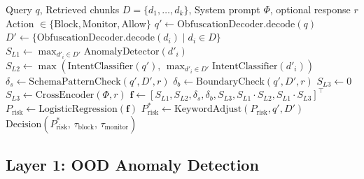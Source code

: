 ﻿\documentclass[conference]{IEEEtran}
\begin{document}
\begin{algorithm}[t]
\caption{RAG-Shield Pipeline Detection Flow}
\label{alg:detection}
\scriptsize
\begin{algorithmic}[1]
\REQUIRE Query $q$, Retrieved chunks $D = \{d_1, \ldots, d_k\}$,
         System prompt $\Phi$, optional response $r$
\ENSURE Action $\in \{\text{Block}, \text{Monitor}, \text{Allow}\}$
\STATE $q' \leftarrow \text{ObfuscationDecoder.decode}(q)$
\STATE $D' \leftarrow \{\text{ObfuscationDecoder.decode}(d_i) \mid d_i \in D\}$
\STATE {}
\STATE $S_{L1} \leftarrow \max_{d'_i \in D'} \text{AnomalyDetector}(d'_i)$
\STATE $S_{L2} \leftarrow \max\!\left(\text{IntentClassifier}(q'),\,
         \max_{d'_i \in D'} \text{IntentClassifier}(d'_i)\right)$
    \RETURN {}
\ENDIF
\STATE $\delta_s \leftarrow \text{SchemaPatternCheck}(q',D',r)$
\STATE $\delta_b \leftarrow \text{BoundaryCheck}(q',D',r)$
\STATE $S_{L3} \leftarrow 0$
        \RETURN {}
    \ENDIF
    \STATE $S_{L3} \leftarrow \text{CrossEncoder}(\Phi, r)$
\ENDIF
\STATE $\mathbf{f} \leftarrow [S_{L1}, S_{L2}, \delta_s, \delta_b, S_{L3},
         S_{L1}{\cdot}S_{L2}, S_{L1}{\cdot}S_{L3}]^{\top}$
\STATE $P_{\text{risk}} \leftarrow \text{LogisticRegression}(\mathbf{f})$
\STATE $P_{\text{risk}}^{*} \leftarrow \text{KeywordAdjust}(P_{\text{risk}},
         q', D')$
\RETURN $\text{Decision}(P_{\text{risk}}^{*},\, \tau_{\text{block}},\,
         \tau_{\text{monitor}})$
\end{algorithmic}
\end{algorithm}

\subsection{Layer 1: OOD Anomaly Detection}
\end{document}

